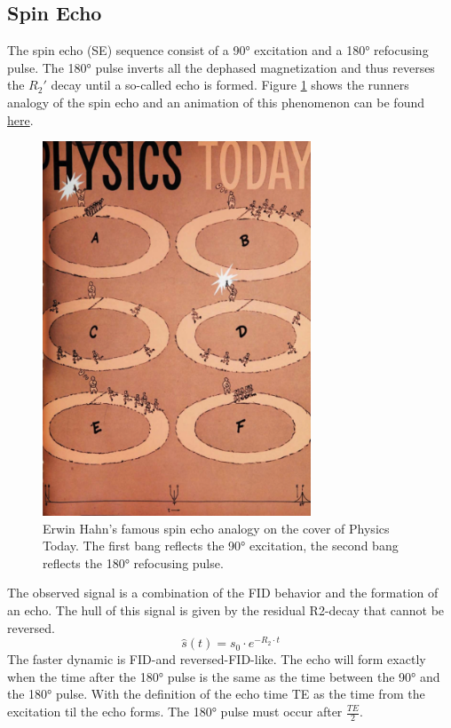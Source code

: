\documentclass[a4paper,12pt]{extarticle}
\begin{document}
\subsection{Spin Echo}
The spin echo (SE) sequence consist of a 90° excitation and a 180° refocusing pulse. The 180° pulse inverts all the dephased magnetization and thus reverses the $R_2'$ decay until a so-called echo is formed. Figure \ref{fig:SE_hahn}  shows the runners analogy of the spin echo and an animation of this phenomenon can be found \href{https://blog.ismrm.org/2017/06/06/dwe-part-2/}{here}.  

\begin{figure}[!ht] 
\centering
\includegraphics[width=8cm]{img/SE_run.png}
\caption{Erwin Hahn’s famous spin echo analogy on the cover of Physics Today. The first bang reflects the 90° excitation, the second bang reflects the 180° refocusing pulse.} \label{fig:SE_hahn}
\end{figure}
The observed signal is a combination of the FID behavior and the formation of an echo. The hull of this signal is given by the residual R2-decay that cannot be reversed. 
\begin{equation}
\label{eq:SE}
\hat{s}(t)=s_0\cdot  e^{-R_2\cdot t}
\end{equation}
The faster dynamic is FID-and reversed-FID-like.
The echo will form exactly when the time after the 180° pulse is the same as the time between the 90° and the 180° pulse. With the definition of the echo time TE as the time from the excitation til the echo forms. The 180° pulse must occur after $\frac{TE}{2}$.
\end{document}

